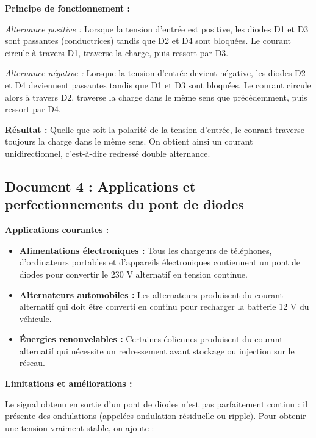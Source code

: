 \documentclass[11pt,a4paper]{article}
\begin{document}
\vspace{0.3cm}
\textbf{Principe de fonctionnement :}

\textit{Alternance positive :} Lorsque la tension d'entrée est positive, les diodes D1 et D3 sont passantes (conductrices) tandis que D2 et D4 sont bloquées. Le courant circule à travers D1, traverse la charge, puis ressort par D3.

\vspace{0.2cm}
\textit{Alternance négative :} Lorsque la tension d'entrée devient négative, les diodes D2 et D4 deviennent passantes tandis que D1 et D3 sont bloquées. Le courant circule alors à travers D2, traverse la charge dans le même sens que précédemment, puis ressort par D4.

\vspace{0.3cm}
\textbf{Résultat :} Quelle que soit la polarité de la tension d'entrée, le courant traverse toujours la charge dans le même sens. On obtient ainsi un courant unidirectionnel, c'est-à-dire redressé double alternance.

\subsection{Document 4 : Applications et perfectionnements du pont de diodes}

\textbf{Applications courantes :}
\begin{itemize}
\item \textbf{Alimentations électroniques :} Tous les chargeurs de téléphones, d'ordinateurs portables et d'appareils électroniques contiennent un pont de diodes pour convertir le 230 V alternatif en tension continue.
\item \textbf{Alternateurs automobiles :} Les alternateurs produisent du courant alternatif qui doit être converti en continu pour recharger la batterie 12 V du véhicule.
\item \textbf{Énergies renouvelables :} Certaines éoliennes produisent du courant alternatif qui nécessite un redressement avant stockage ou injection sur le réseau.
\end{itemize}

\vspace{0.3cm}
\textbf{Limitations et améliorations :}

Le signal obtenu en sortie d'un pont de diodes n'est pas parfaitement continu : il présente des ondulations (appelées ondulation résiduelle ou ripple). Pour obtenir une tension vraiment stable, on ajoute :
\end{document}
